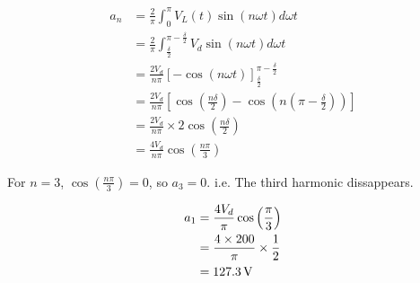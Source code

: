 \subsection{}

\begin{align*}
a_n & = \frac{2}{\pi} \int_0^\pi V_L(t) \sin(n\omega{}t) d\omega t \\
    & = \frac{2}{\pi} \int_{\frac{\delta}{2}}^{\pi-\frac{\delta}{2}} V_d \sin(n\omega{}t) d\omega t \\
    & = \frac{2V_d}{n\pi} \left[- \cos(n\omega{}t) \right]_{\frac{\delta}{2}}^{\pi-\frac{\delta}{2}} \\
    & = \frac{2V_d}{n\pi} \left[\cos(\frac{n\delta}{2})-\cos\left(n\left(\pi-\frac{\delta}{2}\right)\right) \right] \\
    & = \frac{2V_d}{n\pi} \times 2\cos\left(\frac{n\delta}{2}\right) \\
    & = \frac{4V_d}{n\pi}\cos\left(\frac{n\pi}{3}\right)
\end{align*}

For $n=3$, $\cos\left(\frac{n\pi}{3}\right)=0$, so $a_3=0$.
i.e. The third harmonic dissappears.
 
\begin{align*}
a_1 & = \frac{4V_d}{\pi}\cos\left(\frac{\pi}{3}\right) \\
    & = \frac{4\times 200}{\pi}\times\frac{1}{2} \\
    & = \unit[127.3]{V}
\end{align*}